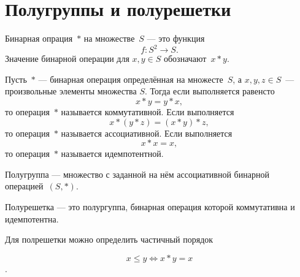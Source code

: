 \chapter{Полугруппы и полурешетки}

\begin{my_def}
Бинарная опрация~$*$ на множестве~$S$ --- это функция
$$f: S^2 \rightarrow S.$$
Значение бинарной операции для $x, y \in S$ обозначают~$x * y$.
\end{my_def}


\begin{my_def}
Пусть~$*$ --- бинарная операция определённая на множесте~$S$, а
$x, y, z \in S$~--- произвольные элементы множества $S$. Тогда если
выполняется равенсто
$$x * y = y * x,$$
то операция~$*$ называется коммутативной.
Если выполняется
$$
x * (y * z) = (x * y) * z,
$$
то операция~$*$ называется ассоциативной.
Если выполняется
$$
x * x = x,
$$
то операция~$*$ называется идемпотентной.
\end{my_def}


\begin{my_def}
Полугруппа --- множество с заданной на нём ассоциативной бинарной операцией~$(S,*)$.
\end{my_def}


\begin{my_def}
Полурешетка --- это полургуппа, бинарная операция которой коммутативна и
идемпотентна.
\end{my_def}

Для полрешетки можно определить частичный порядок

$$x \leq y \Leftrightarrow x*y=x$$.
